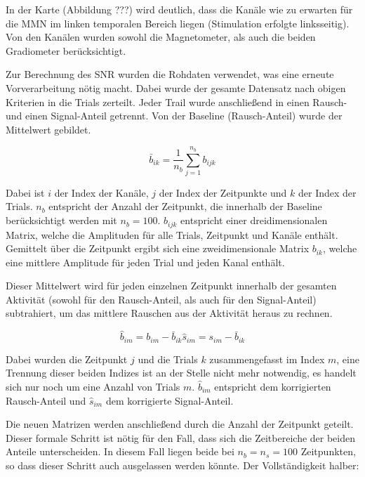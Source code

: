 \documentclass[doc,a4paper,12pt]{apa6}
\begin{document}
In der Karte (Abbildung ???) wird deutlich, dass die Kanäle wie zu erwarten für die MMN im linken temporalen Bereich liegen (Stimulation erfolgte linksseitig). Von den Kanälen wurden sowohl die Magnetometer, als auch die beiden Gradiometer berücksichtigt.

Zur Berechnung des SNR wurden die Rohdaten verwendet, was eine erneute Vorverarbeitung nötig macht. Dabei wurde der gesamte Datensatz nach obigen Kriterien in die Trials zerteilt. Jeder Trail wurde anschließend in einen Rausch- und einen Signal-Anteil getrennt. Von der Baseline (Rausch-Anteil) wurde der Mittelwert gebildet.

\begin{equation}
\bar{b}_{ik} = \frac{1}{n_b} \sum_{j=1}^{n_b} b_{ijk}
\end{equation}

Dabei ist $i$ der Index der Kanäle, $j$ der Index der Zeitpunkte und $k$ der Index der Trials. $n_b$ entspricht der Anzahl der Zeitpunkt, die innerhalb der Baseline berücksichtigt werden mit $n_b = 100$. $b_{ijk}$ entspricht einer dreidimensionalen Matrix, welche die Amplituden für alle Trials, Zeitpunkt und Kanäle enthält. Gemittelt über die Zeitpunkt ergibt sich eine zweidimensionale Matrix $b_{ik}$, welche eine mittlere Amplitude für jeden Trial und jeden Kanal enthält.

Dieser Mittelwert wird für jeden einzelnen Zeitpunkt innerhalb der gesamten Aktivität (sowohl für den Rausch-Anteil, als auch für den Signal-Anteil) subtrahiert, um das mittlere Rauschen aus der Aktivität heraus zu rechnen.

\begin{equation}
\hat{b}_{im} = b_{im} - \bar{b}_{ik}
\hat{s}_{im} = s_{im} - \bar{b}_{ik}
\end{equation}

Dabei wurden die Zeitpunkt $j$ und die Trials $k$ zusammengefasst im Index $m$, eine Trennung dieser beiden Indizes ist an der Stelle nicht mehr notwendig, es handelt sich nur noch um eine Anzahl von Trials $m$. $\hat{b}_{im}$ entspricht dem korrigierten Rausch-Anteil und $\hat{s}_{im}$ dem korrigierte Signal-Anteil.

Die neuen Matrizen werden anschließend durch die Anzahl der Zeitpunkt geteilt. Dieser formale Schritt ist nötig für den Fall, dass sich die Zeitbereiche der beiden Anteile unterscheiden. In diesem Fall liegen beide bei $n_b = n_s = 100$ Zeitpunkten, so dass dieser Schritt auch ausgelassen werden könnte. Der Vollständigkeit halber:
\end{document}

